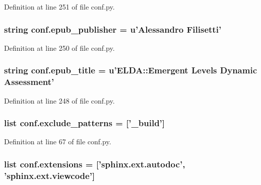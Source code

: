 Definition at line 251 of file conf.\+py.

\hypertarget{a00134_a13c40319d84c9383e0d119773cc1ed02}{
\subsubsection[{epub\+\_\+publisher}]{\setlength{\rightskip}{0pt plus 5cm}string conf.\+epub\+\_\+publisher = u'Alessandro Filisetti'}}\label{a00134_a13c40319d84c9383e0d119773cc1ed02}


Definition at line 250 of file conf.\+py.

\hypertarget{a00134_a9e0d62d22b83ce34deb3f16ba63cedfe}{
\subsubsection[{epub\+\_\+title}]{\setlength{\rightskip}{0pt plus 5cm}string conf.\+epub\+\_\+title = u'E\+L\+D\+A\+::\+Emergent Levels Dynamic Assessment'}}\label{a00134_a9e0d62d22b83ce34deb3f16ba63cedfe}


Definition at line 248 of file conf.\+py.

\hypertarget{a00134_a7ad48fb6f3e9b129c02346ea0d3527c1}{
\subsubsection[{exclude\+\_\+patterns}]{\setlength{\rightskip}{0pt plus 5cm}list conf.\+exclude\+\_\+patterns = \mbox{[}'\+\_\+build'\mbox{]}}}\label{a00134_a7ad48fb6f3e9b129c02346ea0d3527c1}


Definition at line 67 of file conf.\+py.

\hypertarget{a00134_ae475e080536acb271a0a0efe56c3ba42}{
\subsubsection[{extensions}]{\setlength{\rightskip}{0pt plus 5cm}list conf.\+extensions = \mbox{[}'sphinx.\+ext.\+autodoc', 'sphinx.\+ext.\+viewcode'\mbox{]}}}\label{a00134_ae475e080536acb271a0a0efe56c3ba42}



